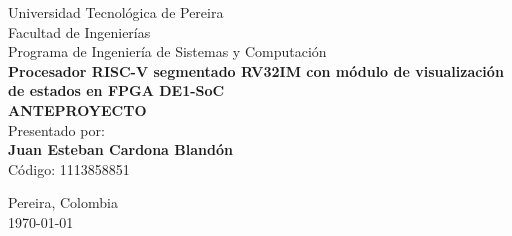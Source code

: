 \begin{titlepage}
    \centering
    \vspace*{0.5cm}
    
    {\Large Universidad Tecnológica de Pereira}\\[0.5cm]
    {\large Facultad de Ingenierías}\\[0.3cm]
    {\large Programa de Ingeniería de Sistemas y Computación}\\[3cm]
    
    {\LARGE\textbf{Procesador RISC-V segmentado RV32IM con módulo de visualización de estados en FPGA DE1-SoC}}\\[2cm]
    
    {\large\textbf{ANTEPROYECTO}}\\[2cm]
    
    {\large Presentado por:}\\[0.3cm]
    {\large\textbf{Juan Esteban Cardona Blandón}}\\[0.3cm]
    {\large Código: 1113858851}\\[2cm]
    
    
    \vfill
    
    {\large Pereira, Colombia}\\[0.3cm]
    {\large \today}
    
\end{titlepage}

